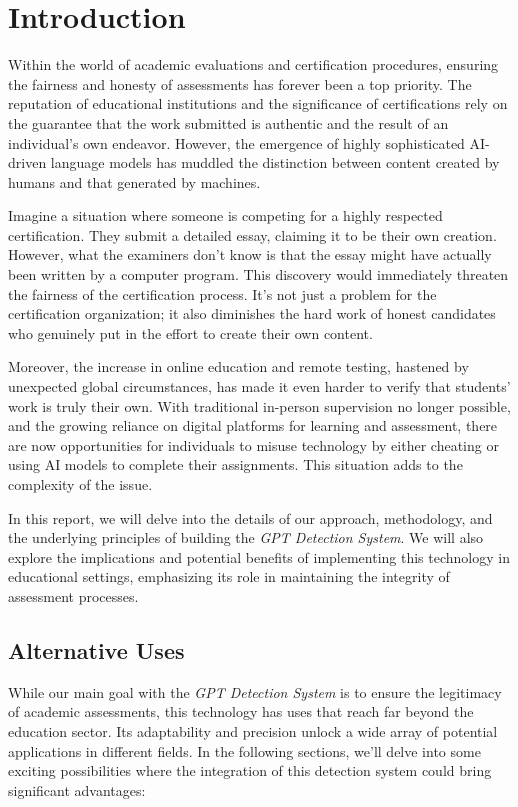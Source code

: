 \chapter{Introduction}

Within the world of academic evaluations and certification procedures, ensuring the fairness and honesty of assessments 
has forever been a top priority. The reputation of educational institutions and the significance of certifications 
rely on the guarantee that the work submitted is authentic and the result of an individual's own endeavor. 
However, the emergence of highly sophisticated AI-driven language models has muddled the distinction between content 
created by humans and that generated by machines.

Imagine a situation where someone is competing for a highly respected certification. They submit a detailed essay, 
claiming it to be their own creation. However, what the examiners don't know is that the essay might have actually 
been written by a computer program. This discovery would immediately threaten the fairness of the certification process. 
It's not just a problem for the certification organization; it also diminishes the hard work of honest candidates who 
genuinely put in the effort to create their own content.

Moreover, the increase in online education and remote testing, hastened by unexpected global circumstances, 
has made it even harder to verify that students' work is truly their own. With traditional in-person supervision no 
longer possible, and the growing reliance on digital platforms for learning and assessment, there are now opportunities 
for individuals to misuse technology by either cheating or using AI models to complete their assignments. This situation 
adds to the complexity of the issue.

In this report, we will delve into the details of our approach, methodology, and the underlying principles of 
building the \textit{GPT Detection System}. We will also explore the implications and potential benefits of implementing 
this technology in educational settings, emphasizing its role in maintaining the integrity of assessment processes. 

\section{Alternative Uses}

While our main goal with the \textit{GPT Detection System} is to ensure the legitimacy of academic assessments, 
this technology has uses that reach far beyond the education sector. Its adaptability and precision unlock a wide array 
of potential applications in different fields. In the following sections, we'll delve into some exciting possibilities 
where the integration of this detection system could bring significant advantages:

